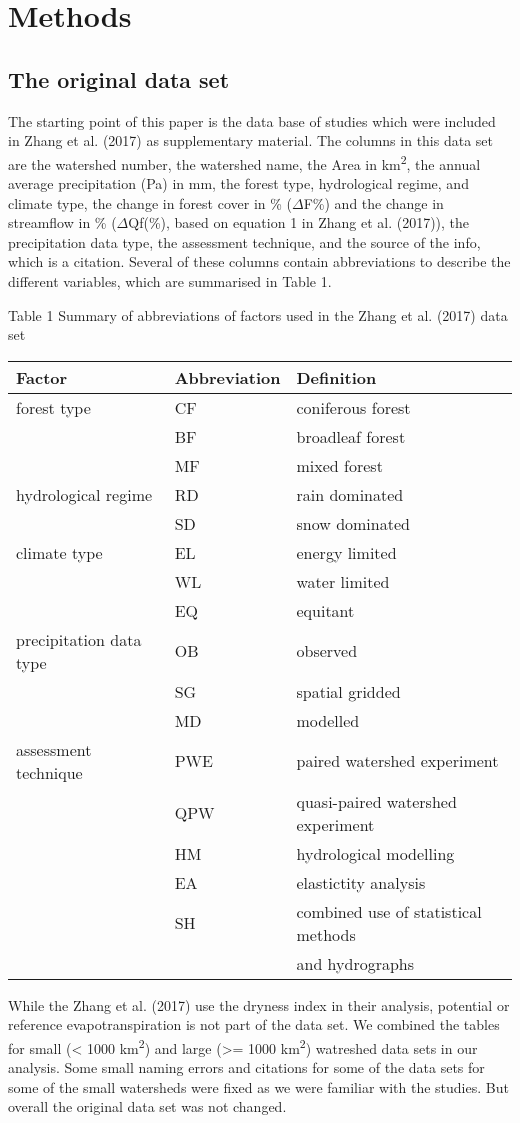\documentclass[]{elsarticle} %
\begin{document}
\hypertarget{methods}{%
\section{Methods}\label{methods}}

\hypertarget{the-original-data-set}{%
\subsection{The original data set}\label{the-original-data-set}}

The starting point of this paper is the data base of studies which were
included in Zhang et al. (2017) as supplementary material. The columns
in this data set are the watershed number, the watershed name, the Area
in km\textsuperscript{2}, the annual average precipitation (Pa) in mm,
the forest type, hydrological regime, and climate type, the change in
forest cover in \% (\(\Delta\)F\%) and the change in streamflow in \%
(\(\Delta\)Qf(\%), based on equation 1 in Zhang et al. (2017)), the
precipitation data type, the assessment technique, and the source of the
info, which is a citation. Several of these columns contain
abbreviations to describe the different variables, which are summarised
in Table 1.

Table 1 Summary of abbreviations of factors used in the Zhang et al.
(2017) data set

\begin{longtable}[]{@{}lll@{}}
\toprule
Factor & Abbreviation & Definition\tabularnewline
\midrule
\endhead
forest type & CF & coniferous forest\tabularnewline
& BF & broadleaf forest\tabularnewline
& MF & mixed forest\tabularnewline
hydrological regime & RD & rain dominated\tabularnewline
& SD & snow dominated\tabularnewline
climate type & EL & energy limited\tabularnewline
& WL & water limited\tabularnewline
& EQ & equitant\tabularnewline
precipitation data type & OB & observed\tabularnewline
& SG & spatial gridded\tabularnewline
& MD & modelled\tabularnewline
assessment technique & PWE & paired watershed experiment\tabularnewline
& QPW & quasi-paired watershed experiment\tabularnewline
& HM & hydrological modelling\tabularnewline
& EA & elastictity analysis\tabularnewline
& SH & combined use of statistical methods\tabularnewline
& & and hydrographs\tabularnewline
\bottomrule
\end{longtable}

While the Zhang et al. (2017) use the dryness index in their analysis,
potential or reference evapotranspiration is not part of the data set.
We combined the tables for small (\textless{} 1000
km\textsuperscript{2}) and large (\textgreater= 1000
km\textsuperscript{2}) watreshed data sets in our analysis. Some small
naming errors and citations for some of the data sets for some of the
small watersheds were fixed as we were familiar with the studies. But
overall the original data set was not changed.
\end{document}
